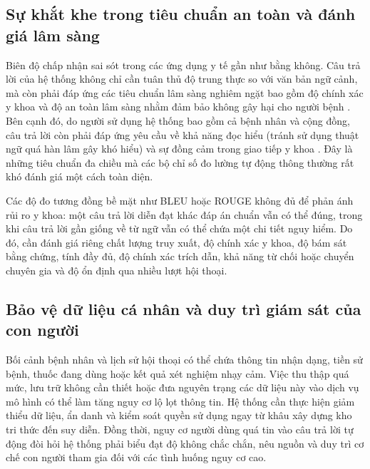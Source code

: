\subsection{Sự khắt khe trong tiêu chuẩn an toàn và đánh giá lâm sàng}
Biên độ chấp nhận sai sót trong các ứng dụng y tế gần như bằng không. Câu trả lời của hệ thống không chỉ cần tuân thủ độ trung thực so với văn bản ngữ cảnh, mà còn phải đáp ứng các tiêu chuẩn lâm sàng nghiêm ngặt bao gồm độ chính xác y khoa và độ an toàn lâm sàng nhằm đảm bảo không gây hại cho người bệnh \cite{who2022musculoskeletal, medtrustrag}. Bên cạnh đó, do người sử dụng hệ thống bao gồm cả bệnh nhân và cộng đồng, câu trả lời còn phải đáp ứng yêu cầu về khả năng đọc hiểu (tránh sử dụng thuật ngữ quá hàn lâm gây khó hiểu) và sự đồng cảm trong giao tiếp y khoa \cite{ortho_rag_13}. Đây là những tiêu chuẩn đa chiều mà các bộ chỉ số đo lường tự động thông thường rất khó đánh giá một cách toàn diện.

Các độ đo tương đồng bề mặt như BLEU hoặc ROUGE không đủ để phản ánh rủi ro y khoa: một câu trả lời diễn đạt khác đáp án chuẩn vẫn có thể đúng, trong khi câu trả lời gần giống về từ ngữ vẫn có thể chứa một chi tiết nguy hiểm. Do đó, cần đánh giá riêng chất lượng truy xuất, độ chính xác y khoa, độ bám sát bằng chứng, tính đầy đủ, độ chính xác trích dẫn, khả năng từ chối hoặc chuyển chuyên gia và độ ổn định qua nhiều lượt hội thoại.

\subsection{Bảo vệ dữ liệu cá nhân và duy trì giám sát của con người}
Bối cảnh bệnh nhân và lịch sử hội thoại có thể chứa thông tin nhận dạng, tiền sử bệnh, thuốc đang dùng hoặc kết quả xét nghiệm nhạy cảm. Việc thu thập quá mức, lưu trữ không cần thiết hoặc đưa nguyên trạng các dữ liệu này vào dịch vụ mô hình có thể làm tăng nguy cơ lộ lọt thông tin. Hệ thống cần thực hiện giảm thiểu dữ liệu, ẩn danh và kiểm soát quyền sử dụng ngay từ khâu xây dựng kho tri thức đến suy diễn. Đồng thời, nguy cơ người dùng quá tin vào câu trả lời tự động đòi hỏi hệ thống phải biểu đạt độ không chắc chắn, nêu nguồn và duy trì cơ chế con người tham gia đối với các tình huống nguy cơ cao.
